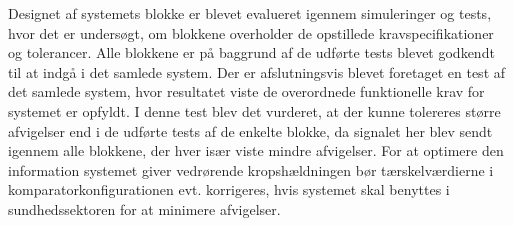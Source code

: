 Designet af systemets blokke er blevet evalueret igennem simuleringer og tests, hvor det er undersøgt, om blokkene overholder de opstillede kravspecifikationer og tolerancer. Alle blokkene er på baggrund af de udførte tests blevet godkendt til at indgå i det samlede system. Der er afslutningsvis blevet foretaget en test af det samlede system, hvor resultatet viste de overordnede funktionelle krav for systemet er opfyldt. I denne test blev det vurderet, at der kunne tolereres større afvigelser end i de udførte tests af de enkelte blokke, da signalet her blev sendt igennem alle blokkene, der hver især viste mindre afvigelser. For at optimere den information systemet giver vedrørende kropshældningen bør tærskelværdierne i komparatorkonfigurationen evt. korrigeres, hvis systemet skal benyttes i sundhedssektoren for at minimere afvigelser.  


\clearpage